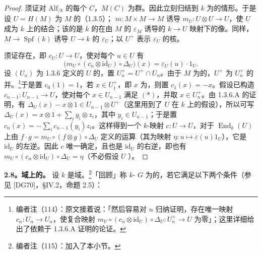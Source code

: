 \begin{proof}
须证对 $\mathrm{Alf}_{/k}$ 的每个 $C$，$M(C)$ 为群。因此立刻归结到 $k$ 为的情形。于是设 $U=H(M)$ 为 $M$ 的（1.3.5）； $m:M\times M\to M$ 诱导 $m_U:U\otimes U\to U$，使 $U$ 成为 $k$ 上的结合；该的是 $k$ 的在由 $M$ 的 $\varepsilon_M$ 诱导的 $k\to U$ 映射下的像。同样， $M\to\operatorname{Spf}(k)$ 诱导 $U\to k$ 的 $\varepsilon_U$；以 $U^+$ 表示 $\varepsilon_U$ 的核。

须证存在，即 $c_U:U\to U$，使对每个 $u\in U$ 有
\[
\bigl(m_U\circ(c_n\otimes\mathrm{id}_U)\circ\Delta_U\bigr)(x)=\varepsilon_U(u)\cdot1_U.\tag{*}
\]
设 $(U_n)$ 为 1.3.6 定义的 $U$ 的，置 $U_n^+=U^+\cap U_n$。由于 $M$ 为的，$U^+$ 为 $U_n^+$ 的并。\footnote{编者注（114）：原文接着说：「然后容易对 $n$ 归纳证明，存在唯一映射 $c_n:U_n\to U_n$，使复合映射 $m_U\circ(c_n\otimes\mathrm{id}_U)\circ\Delta_U:U_n^+\to U$ 为零」；这里详细给出了依赖于 1.3.6.A 证明的论证。}于是置 $c_0(1)=1$，若 $x\in U_1^+$，即 $x$ 为，则置 $c_1(x)=-x$。假设已构造 $c_{n-1}:U_{n-1}\to U$，使对每个 $x\in U_{n-1}$ 满足 $(*)$，并取 $x\in U_n^+$。由 1.3.6.A 的证明，有 $\Delta_U(x)-x\otimes1\in U_{n-1}\otimes U^+$（这里用到了 $U$ 在 $k$ 上的假设），所以可写 $\Delta_U(x)=x\otimes1+\sum_i y_i\otimes z_i$，其中 $y_i\in U_{n-1}$；于是置 $c_n(x)=-\sum_i c_{n-1}(y_i)z_i$。这样得到一个 $k$-映射 $c:U\to U$，对于 $\operatorname{End}_k(U)$ 上由 $f\cdot g=m_U\circ(f\otimes g)\circ\Delta_U$ 定义的运算（其为映射 $\eta:u\mapsto\varepsilon(u)1_U$），它是 $\mathrm{id}_U$ 的左逆。因此 $c$ 唯一确定，且也是 $\mathrm{id}_U$ 的右逆，即也有 $m_U\circ(c_n\otimes\mathrm{id}_U)\circ\Delta_U=\eta$（不必假设 $U$ ）。
\end{proof}

\textbf{2.8。域上的。} 设 $k$ 是域。\footnote{编者注（115）：加入了本小节。}「回顾」称 $k$- $G$ 为的，若它满足以下两个条件（参见 [DG70]，§IV.2，命题 2.5）：

